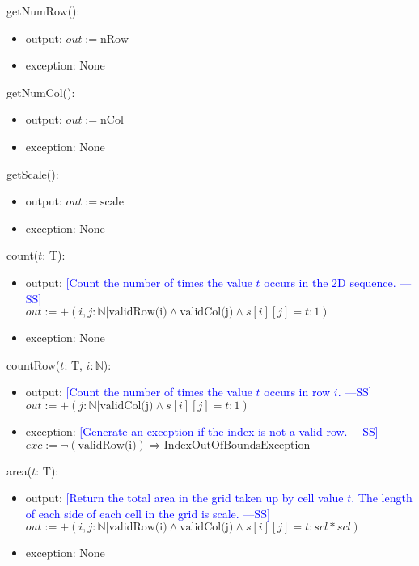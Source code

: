 \documentclass[12pt]{article}
\newcommand{\authornote}[3]{\textcolor{#1}{[#3 ---#2]}}
\newcommand{\authornote}[3]{}
\newcommand{\wss}[1]{\authornote{blue}{SS}{#1}}
\begin{document}
\noindent getNumRow():
\begin{itemize}
\item output: $out := \mbox{nRow}$
\item exception: None
\end{itemize}

\noindent getNumCol():
\begin{itemize}
\item output: $out := \mbox{nCol}$
\item exception: None
\end{itemize}

\noindent getScale():
\begin{itemize}
\item output: $out := \mbox{scale}$
\item exception: None
\end{itemize}

\noindent count($t$: T):
\begin{itemize}
\item output: \wss{Count the number of times the value $t$ occurs in the 2D
    sequence.} \\
$out := +(i,j : \mathbb{N} | \mbox{validRow(i)} \land \mbox{validCol(j)} \land s[i][j] = t : 1)$
\item exception: None
\end{itemize}

\noindent countRow($t$: T, $i: \mathbb{N}$):
\begin{itemize}
\item output: \wss{Count the number of times the value $t$ occurs in row
    $i$.} \\
$out := +(j : \mathbb{N} | \mbox{validCol(j)} \land s[i][j] = t : 1)$
\item exception: \wss{Generate an exception if the index is not a valid
    row.} \\
$exc := \lnot (\mbox{validRow(i)}) \Rightarrow \mbox{IndexOutOfBoundsException}$
\end{itemize}

\noindent area($t$: T):
\begin{itemize}
\item output: \wss{Return the total area in the grid taken up by cell value $t$.
    The length of each side of each cell in the grid is
    scale.} \\
$out := +(i,j : \mathbb{N} | \mbox{validRow(i)} \land \mbox{validCol(j)} \land s[i][j] = t : scl*scl)$
\item exception: None
\end{itemize}
\end{document}
